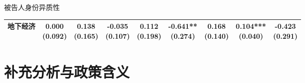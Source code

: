 \documentclass[aspectratio=169,10pt]{ctexbeamer}
\begin{document}
\begin{frame}[plain]{被告人身份异质性}
\begin{adjustbox}{width=\textwidth}
\begin{tabular}{lcccccccc}
    地下经济 & \makecell{0.000\\(0.092)} & \makecell{0.138\\(0.165)} & \makecell{-0.035\\(0.107)} & \makecell{0.112\\(0.198)} & \makecell{-0.641**\\(0.274)} & \makecell{0.168\\(0.140)} & \makecell{0.104***\\(0.040)} & \makecell{-0.423\\(0.291)} \\
    \bottomrule
  \end{tabular}
  \end{adjustbox}

  \vspace{0.35em}
\end{frame}

\section{补充分析与政策含义}
\end{document}
